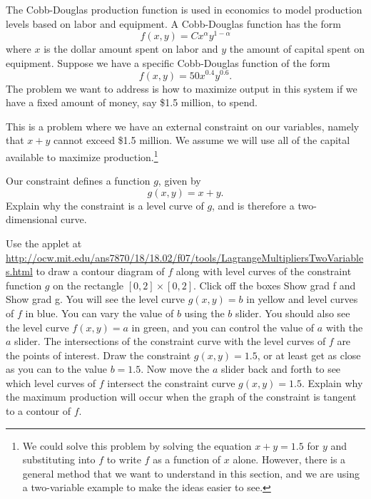\begin{pa} \label{PA:10.8} The Cobb-Douglas production function is used in economics to model production levels based on labor and equipment. A Cobb-Douglas function has the form
\[f(x,y) = Cx^{\alpha}y^{1-\alpha}\]
where $x$ is the dollar amount spent on labor and $y$ the amount of capital spent on equipment. Suppose we have a specific Cobb-Douglas function of the form
\[f(x, y) = 50 x^{0.4}y^{0.6}.\]
The problem we want to address is how to maximize output in this system if we have a fixed amount of money, say \$1.5 million, to spend.

This is a problem where we have an external constraint on our variables, namely that  $x + y$  cannot exceed \$1.5 million. We assume we will use all of the capital available to maximize production.\footnote{We could solve this problem by solving the equation $x+y = 1.5$ for $y$ and substituting into $f$ to write $f$ as a function of $x$ alone. However, there is a general method that we want to understand in this section, and we are using a two-variable example to make the ideas easier to see.}
    \ba
    \item Our constraint defines a function $g$, given by
    \[g(x,y) = x+y.\]
    Explain why the constraint is a level curve of $g$, and is therefore a two-dimensional curve.



\begin{comment}

A level curve is a curve obtained by setting the dependent variable equal to a constant. So if $g(x,y) = x+y$, then the equation $1.5 = x+y = g(x,y)$ is a level of $g$.



\end{comment}

    \item Use the applet at \\
    \url{http://ocw.mit.edu/ans7870/18/18.02/f07/tools/LagrangeMultipliersTwoVariables.html} to draw a contour diagram of $f$ along with level curves of the constraint function $g$ on the rectangle $[0,2] \times [0,2]$. Click off the boxes Show grad f and Show grad g. You will see the level curve $g(x,y) = b$ in yellow and level curves of $f$ in blue. You can vary the value of $b$ using the $b$ slider. You should also see the level curve $f(x,y) = a$ in green, and you can control the value of $a$ with the $a$ slider. The intersections of the constraint curve with the level curves of $f$ are the points of interest. Draw the constraint $g(x,y) = 1.5$, or at least get as close as you can to the value $b=1.5$. Now move the $a$ slider back and forth to see which level curves of $f$ intersect the constraint curve $g(x,y) = 1.5$. Explain why the maximum production will occur when the graph of the constraint is tangent to a contour of $f$.




\end{pa}
